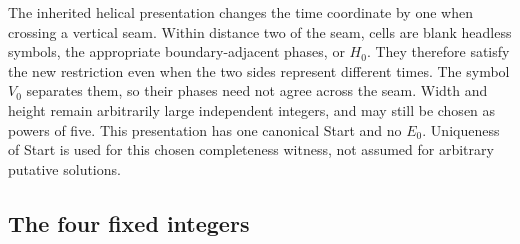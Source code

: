 The inherited helical presentation changes the time coordinate by one
when crossing a vertical seam.  Within distance two of the seam, cells
are blank headless symbols, the appropriate boundary-adjacent phases,
or $H_0$.  They therefore satisfy the new restriction even when the
two sides represent different times.  The symbol $V_0$ separates them,
so their phases need not agree across the seam.  Width and height remain
arbitrarily large independent integers, and may still be chosen as
powers of five.  This presentation has one canonical Start and no
$E_0$.  Uniqueness of Start is used for this chosen completeness
witness, not assumed for arbitrary putative solutions.

\subsection{The four fixed integers}

